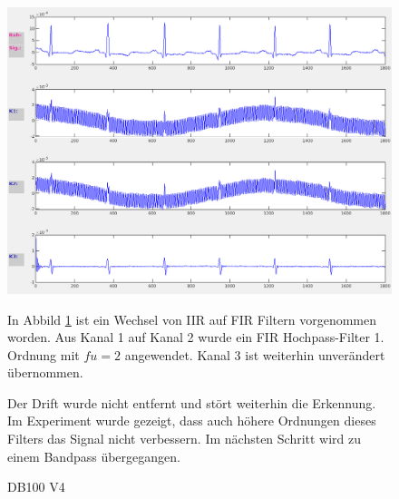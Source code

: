 \documentclass[a4paper,12pt,titlepage]{scrartcl}
\begin{document}
\begin{figure}[ht]
    \begin{minipage}[t]{0.5\linewidth}
        \centering
        \includegraphics[width=0.9\linewidth, valign=t]{Assets/LaborBMT-15-42-26.png}
        \caption{DB100 V4}
        \label{db100v4}
    \end{minipage}%
    \begin{minipage}[t]{0.5\linewidth}
        In Abbild \ref{db100v4} ist ein Wechsel von IIR auf FIR Filtern vorgenommen worden. Aus Kanal 1 auf Kanal 2 wurde ein FIR Hochpass-Filter 1. Ordnung mit $fu=2$ angewendet. Kanal 3 ist weiterhin unverändert übernommen.

        Der Drift wurde nicht entfernt und stört weiterhin die Erkennung. Im Experiment wurde gezeigt, dass auch höhere Ordnungen dieses Filters das Signal nicht verbessern. Im nächsten Schritt wird zu einem Bandpass übergegangen.
    \end{minipage}
\end{figure}
\end{document}

